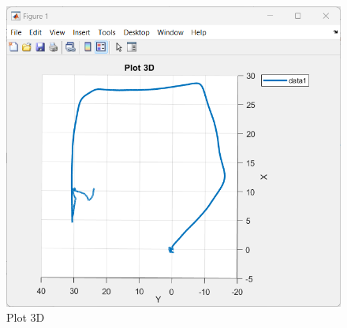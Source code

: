 \begin{enumerate}
\begin{itemize}
\begin{figure}[htbp]
\begin{minipage}[b]{0.5\linewidth}
                \includegraphics[width=\linewidth]{files/images/plot3D_1.png} %
            \end{minipage}
            \caption{Plot 3D}
            \label{fig:Plot3D}
        \end{figure}
    \end{itemize}

    
\end{enumerate}








